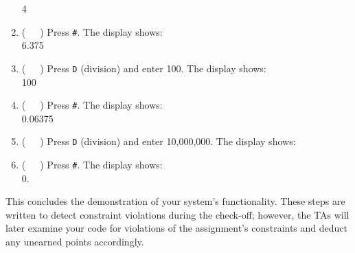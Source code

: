 \begin{enumerate}[resume]
    {\dviiseg \phantom{8888888}4}
\item (\ \ \ ) Press \texttt{\#}. The display shows: \\
    {\dviiseg \phantom{8888}6.375}
\item (\ \ \ ) Press \texttt{D} (division) and enter 100. The display shows: \\
    {\dviiseg \phantom{88888}100}
\item (\ \ \ ) Press \texttt{\#}. The display shows: \\
    {\dviiseg \phantom{88}0.06375}
\item (\ \ \ ) Press \texttt{D} (division) and enter 10,000,000. The display
    shows: \\
    {}
\item (\ \ \ ) Press \texttt{\#}. The display shows: \\
    {\dviiseg \phantom{8888888}0.}
\end{enumerate}

This concludes the demonstration of your system's functionality. These steps
are written to detect constraint violations during the check-off; however, the
TAs will later examine your code for violations of the assignment's constraints
and deduct any unearned points accordingly.


